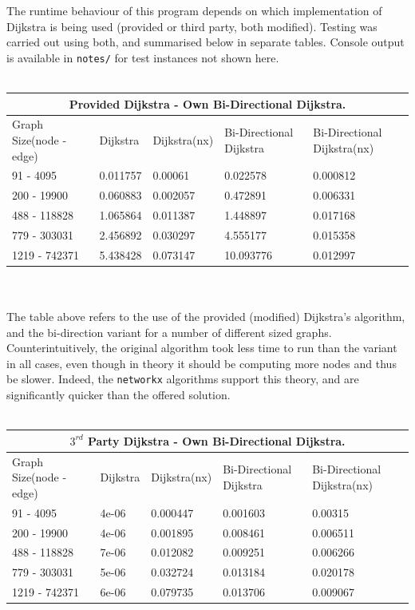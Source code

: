 \documentclass[paper=a4, fontsize=11pt]{scrartcl} %
\begin{document}
\par{The runtime behaviour of this program depends on which implementation of Dijkstra is being used (provided or third party, both modified). Testing was carried out using both, and summarised below in separate tables. Console output is available in \texttt{notes/} for test instances not shown here. }
\\\\
\begin{tabular}{ |p{4cm}||p{1.5cm}|p{2cm}|p{3.8cm}|p{4.6cm}|  }
 \hline
 \multicolumn{5}{|c|}{Provided Dijkstra - Own Bi-Directional Dijkstra.} \\
 \hline
 Graph Size(node - edge)& Dijkstra &Dijkstra(nx) &Bi-Directional Dijkstra & Bi-Directional Dijkstra(nx)\\
 \hline
  91 - 4095 & 0.011757   & 0.00061 &  0.022578 & 0.000812\\
 200 - 19900  & 0.060883  & 0.002057 &  0.472891 & 0.006331\\
 488 - 118828  & 1.065864   & 0.011387 &  1.448897 & 0.017168\\
 779 - 303031 & 2.456892   & 0.030297 &  4.555177 & 0.015358\\
 1219 - 742371  & 5.438428   & 0.073147 &  10.093776 & 0.012997\\
 \hline
\end{tabular}
\\\\
The table above refers to the use of the provided (modified) Dijkstra's algorithm, and the bi-direction variant for a number of different sized graphs. Counterintuitively, the original algorithm took less time to run than the variant in all cases, even though in theory it should be computing more nodes and thus be slower. Indeed, the \texttt{networkx} algorithms support this theory, and are significantly quicker than the offered solution. \\\\
\begin{tabular}{ |p{4cm}||p{1.5cm}|p{2cm}|p{3.8cm}|p{4.6cm}|  }
 \hline
 \multicolumn{5}{|c|}{$3^{rd}$ Party Dijkstra - Own Bi-Directional Dijkstra.} \\
 \hline
 Graph Size(node - edge)& Dijkstra &Dijkstra(nx) &Bi-Directional Dijkstra & Bi-Directional Dijkstra(nx)\\
 \hline
  91 - 4095 & 4e-06   & 0.000447 &  0.001603 & 0.00315\\
 200 - 19900  & 4e-06   & 0.001895 &  0.008461 & 0.006511\\
 488 - 118828  & 7e-06   & 0.012082 &  0.009251 & 0.006266\\
 779 - 303031 & 5e-06   & 0.032724 &  0.013184 & 0.020178\\
 1219 - 742371  & 6e-06  & 0.079735 &  0.013706 & 0.009067\\
 \hline
\end{tabular}
\end{document}
